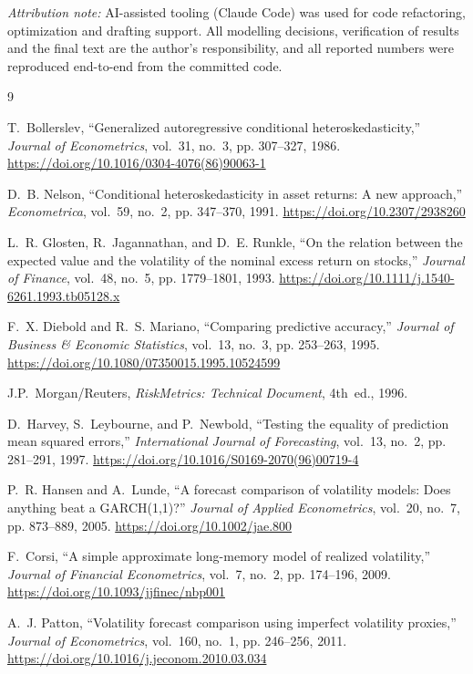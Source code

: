\documentclass[a4paper,twocolumn,10pt]{article}
\begin{document}
\noindent\textit{Attribution note:} AI-assisted tooling (Claude Code) was used for code refactoring, optimization and drafting support. All modelling decisions, verification of results and the final text are the author's responsibility, and all reported numbers were reproduced end-to-end from the committed code.

\begin{thebibliography}{9}

T.~Bollerslev, ``Generalized autoregressive conditional heteroskedasticity,'' \textit{Journal of Econometrics}, vol.~31, no.~3, pp. 307--327, 1986. \url{https://doi.org/10.1016/0304-4076(86)90063-1}

D.~B. Nelson, ``Conditional heteroskedasticity in asset returns: A new approach,'' \textit{Econometrica}, vol.~59, no.~2, pp. 347--370, 1991. \url{https://doi.org/10.2307/2938260}

L.~R. Glosten, R.~Jagannathan, and D.~E. Runkle, ``On the relation between the expected value and the volatility of the nominal excess return on stocks,'' \textit{Journal of Finance}, vol.~48, no.~5, pp. 1779--1801, 1993. \url{https://doi.org/10.1111/j.1540-6261.1993.tb05128.x}

F.~X. Diebold and R.~S. Mariano, ``Comparing predictive accuracy,'' \textit{Journal of Business \& Economic Statistics}, vol.~13, no.~3, pp. 253--263, 1995. \url{https://doi.org/10.1080/07350015.1995.10524599}

J.P.~Morgan/Reuters, \textit{RiskMetrics: Technical Document}, 4th~ed., 1996.

D.~Harvey, S.~Leybourne, and P.~Newbold, ``Testing the equality of prediction mean squared errors,'' \textit{International Journal of Forecasting}, vol.~13, no.~2, pp. 281--291, 1997. \url{https://doi.org/10.1016/S0169-2070(96)00719-4}

P.~R. Hansen and A.~Lunde, ``A forecast comparison of volatility models: Does anything beat a GARCH(1,1)?'' \textit{Journal of Applied Econometrics}, vol.~20, no.~7, pp. 873--889, 2005. \url{https://doi.org/10.1002/jae.800}

F.~Corsi, ``A simple approximate long-memory model of realized volatility,'' \textit{Journal of Financial Econometrics}, vol.~7, no.~2, pp. 174--196, 2009. \url{https://doi.org/10.1093/jjfinec/nbp001}

A.~J. Patton, ``Volatility forecast comparison using imperfect volatility proxies,'' \textit{Journal of Econometrics}, vol.~160, no.~1, pp. 246--256, 2011. \url{https://doi.org/10.1016/j.jeconom.2010.03.034}

\end{thebibliography}
\end{document}

